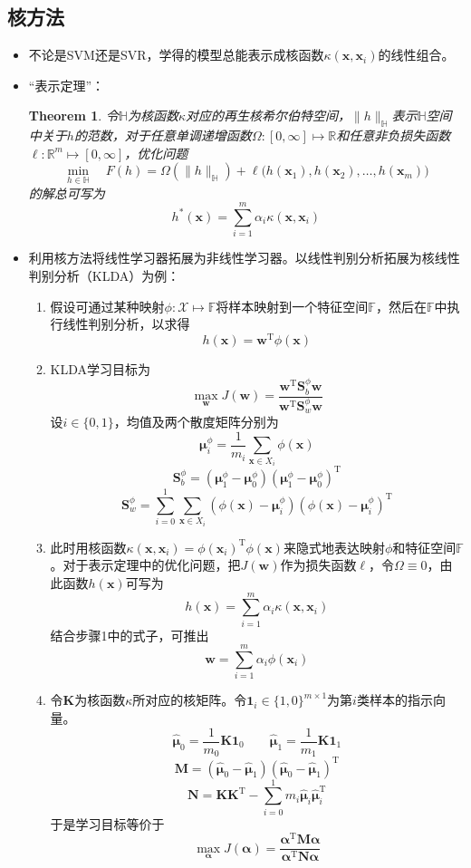 \documentclass{ctexart}
\newtheorem{theorem}{Theorem}
\begin{document}
				\subsection{核方法}
					\begin{itemize}
						\item 不论是SVM还是SVR，学得的模型总能表示成核函数$\kappa(\bm{x},\bm{x}_i)$的线性组合。
						\item ``表示定理''：\begin{theorem}
							令$\mathbb{H}$为核函数$\kappa$对应的再生核希尔伯特空间，$\parallel h\parallel_{\mathbb{H}}$表示$\mathbb{H}$空间中关于$h$的范数，对于任意单调递增函数$\Omega:[0,\infty]\mapsto\mathbb{R}$和任意非负损失函数$\ell:\mathbb{R}^m\mapsto[0,\infty]$，优化问题\[\min\limits_{h\in\mathbb{H}}\quad F(h)=\Omega(\parallel h\parallel_{\mathbb{H}})+\ell\big(h(\bm{x}_1),h(\bm{x}_2),\dots,h(\bm{x}_m)\big)\]的解总可写为\[h^*(\bm{x})=\sum_{i=1}^{m}\alpha_i\kappa(\bm{x},\bm{x}_i)\]
						\end{theorem}
					\item 利用核方法将线性学习器拓展为非线性学习器。以线性判别分析拓展为核线性判别分析（KLDA）为例：\begin{enumerate}
						\item 假设可通过某种映射$\phi:\mathcal{X}\mapsto\mathbb{F}$将样本映射到一个特征空间$\mathbb{F}$，然后在$\mathbb{F}$中执行线性判别分析，以求得\[h(\bm{x})=\bm{w}^{\mathrm{T}}\phi(\bm{x})\]
						\item KLDA学习目标为\[\max\limits_{\bm{w}}J(\bm{w})=\frac{\bm{w}^{\mathrm{T}}\bm{S}_b^\phi\bm{w}}{\bm{w}^{\mathrm{T}}\bm{S}_w^\phi\bm{w}}\]设$i\in\{0,1\}$，均值及两个散度矩阵分别为\[\bm{\mu}_i^\phi=\frac{1}{m_i}\sum_{\bm{x}\in X_i}^{}\phi(\bm{x})\]\[\bm{S}_b^\phi=(\bm{\mu}_1^\phi-\bm{\mu}_0^\phi)(\bm{\mu}_1^\phi-\bm{\mu}_0^\phi)^{\mathrm{T}}\]\[\bm{S}_w^\phi=\sum_{i=0}^{1}\sum_{\bm{x}\in X_i}^{}(\phi(\bm{x})-\bm{\mu}_i^\phi)(\phi(\bm{x})-\bm{\mu}_i^\phi)^{\mathrm{T}}\]
						\item 此时用核函数$\kappa(\bm{x},\bm{x}_i)=\phi(\bm{x}_i)^{\mathrm{T}}\phi(\bm{x})$来隐式地表达映射$\phi$和特征空间$\mathbb{F}$。对于表示定理中的优化问题，把$J(\bm{w})$作为损失函数$\ell$，令$\Omega\equiv0$，由此函数$h(\bm{x})$可写为\[h(\bm{x})=\sum_{i=1}^{m}\alpha_i\kappa(\bm{x},\bm{x}_i)\]结合步骤1中的式子，可推出\[\bm{w}=\sum_{i=1}^{m}\alpha_i\phi(\bm{x}_i)\]
						\item 令$\mathbf{K}$为核函数$\kappa$所对应的核矩阵。令$\bm{1}_i\in\{1,0\}^{m\times1}$为第$i$类样本的指示向量。\[\hat{\bm{\mu}}_0=\frac{1}{m_0}\mathbf{K1}_0\qquad\hat{\bm{\mu}}_1=\frac{1}{m_1}\mathbf{K1}_1\]\[\mathbf{M}=(\hat{\bm{\mu}}_0-\hat{\bm{\mu}}_1)(\hat{\bm{\mu}}_0-\hat{\bm{\mu}}_1)^{\mathrm{T}}\]\[\mathbf{N}=\mathbf{KK}^{\mathrm{T}}-\sum_{i=0}^{1}m_i\hat{\bm{\mu}}_i\hat{\bm{\mu}}_i^{\mathrm{T}}\]于是学习目标等价于\[\max\limits_{\bm{\alpha}}J(\bm{\alpha})=\frac{\bm{\alpha}^{\mathrm{T}}\mathbf{M}\bm{\alpha}}{\bm{\alpha}^{\mathrm{T}}\mathbf{N}\bm{\alpha}}\]

\end{enumerate}
\end{itemize}
\end{document}
